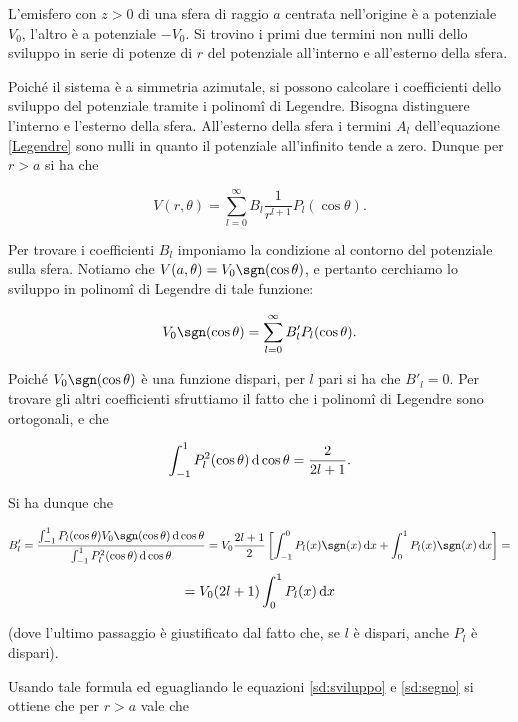 \documentclass[../main.tex]{subfiles}
\begin{document}

\textex

L'emisfero con $z>0$ di una sfera di raggio $a$ centrata nell'origine è a potenziale $V_0$, l'altro è a potenziale $-V_0$.
Si trovino i primi due termini non nulli dello sviluppo in serie di potenze di $r$ del potenziale all'interno e all'esterno
della sfera.

\solution

Poiché il sistema è a simmetria azimutale, si possono calcolare i coefficienti dello sviluppo del potenziale tramite i
polinomî di Legendre.
Bisogna distinguere l'interno e l'esterno della sfera.
All'esterno della sfera i termini $A_l$ dell'equazione \ref{Legendre} sono nulli in quanto il potenziale all'infinito tende a
zero.
Dunque per $r>a$ si ha che

\begin{equation}\label{sd:sviluppo}
V(r,\theta)=\sum_{l=0}^{\infty}B_l\frac{1}{r^{l+1}}P_l(\cos\theta).
\end{equation}

Per trovare i coefficienti $B_l$ imponiamo la condizione al contorno del potenziale sulla sfera.
Notiamo che $V(a,\theta)=V_0\sgn(\cos\theta)$, e pertanto cerchiamo lo sviluppo in polinomî di
Legendre di tale funzione:

\begin{equation}\label{sd:segno}
V_0\sgn(\cos\theta)=\sum_{l=0}^{\infty}B'_lP_l(\cos\theta).
\end{equation}

Poiché $V_0\sgn(\cos\theta)$ è una funzione dispari, per $l$ pari si ha che $B'_l=0$.
Per trovare gli altri coefficienti sfruttiamo il fatto che i polinomî di Legendre sono ortogonali, e che

$$\int_{-1}^1P_l^2(\cos\theta)\,\mathrm d\cos\theta=\frac{2}{2l+1}.$$

Si ha dunque che

$$B'_l=\frac{\int_{-1}^1P_l(\cos\theta)V_0\sgn(\cos\theta)\de \cos\theta}{\int_{-1}^1P_l^2(\cos\theta)\de\cos\theta}=
V_0\frac{2l+1}{2}\left[\int_{-1}^0P_l(x)\sgn(x)\de x+\int_{0}^1P_l(x)\sgn(x)\de x\right]=$$
$$=V_0(2l+1)\int_{0}^1P_l(x)\,\mathrm d x$$

(dove l'ultimo passaggio è giustificato dal fatto che, se $l$ è dispari, anche $P_l$ è dispari).

Usando tale formula ed eguagliando le equazioni \ref{sd:sviluppo} e \ref{sd:segno} si ottiene che per $r>a$ vale che
\end{document}
